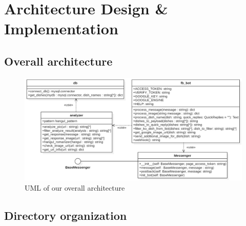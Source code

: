 \section{Architecture Design \& Implementation}
\subsection{Overall architecture}

\begin{figure}[htb]
\centerline{\includegraphics[width=\linewidth]{./pictures/uml}}
\caption{UML of our overall architecture}
\label{fig:uml}
\end{figure}
\FloatBarrier

\subsection{Directory organization}

